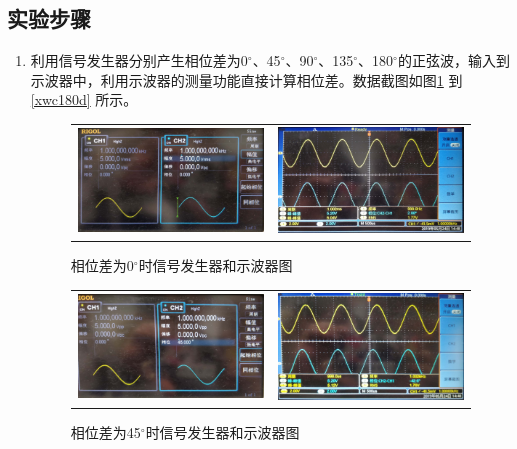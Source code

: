 \documentclass[12pt]{article}
\begin{document}
\subsection{实验步骤}
\begin{enumerate}
  \item 利用信号发生器分别产生相位差为0$^{\circ}$、45$^{\circ}$、90$^{\circ}$、135$^{\circ}$、180$^{\circ}$的正弦波，输入到示波器中，利用示波器的测量功能直接计算相位差。数据截图如图\ref{xwc0d}
      到\ref{xwc180d}
      所示。
  \begin{figure}[htbp]
    \centering
    \begin{tabular}{cc}
    \includegraphics[width=.5\textwidth]{P015}&\includegraphics[width=.5\textwidth]{P012}\\
     \end{tabular}
    \caption{相位差为0$^{\circ}$时信号发生器和示波器图}\label{xwc0d}
  \end{figure}

    \begin{figure}[htbp]
    \centering
    \begin{tabular}{cc}
    \includegraphics[width=.5\textwidth]{P026}&\includegraphics[width=.5\textwidth]{P002}\\
     \end{tabular}
    \caption{相位差为45$^{\circ}$时信号发生器和示波器图}\label{xwc45d}
  \end{figure}


\end{enumerate}
\end{document}
